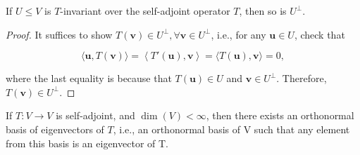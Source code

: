 \begin{proposition}\label{prop:self-adjoint-orthogonal-space}
If \(U \leq V\) is \(T\)-invariant over the self-adjoint operator \(T\), then so is \(U^\perp\).
\end{proposition}

\begin{proof}
It suffices to show \(T\left( \mathbf{v}\right)  \in  {U}^{ \bot  },\forall \mathbf{v} \in  {U}^{ \bot  }\), i.e., for any \(\mathbf{u} \in  U\), check that

\[
\langle \mathbf{u},T\left( \mathbf{v}\right) \rangle  = \left\langle  {T'\left( \mathbf{u}\right),\mathbf{v}}\right\rangle   = \langle T\left( \mathbf{u}\right),\mathbf{v}\rangle  = 0,
\]

where the last equality is because that \(T\left( \mathbf{u}\right)  \in  U\) and \(\mathbf{v} \in  {U}^{ \bot  }\). Therefore, \(T\left( \mathbf{v}\right)  \in  {U}^{ \bot  }\).
\end{proof}

\begin{theorem}\label{thm: spectral-self-aadjoint}
If \(T : V \rightarrow V\) is self-adjoint, and \(\dim(V) < \infty\), then there exists an orthonormal basis of eigenvectors of \(T\), i.e., an orthonormal basis of V such that any element from this
basis is an eigenvector of T.
\end{theorem}

